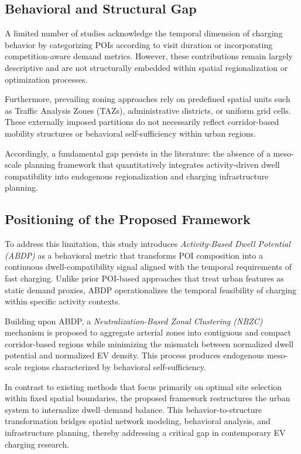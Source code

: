 \documentclass[conference]{IEEEtran}
\begin{document}
\subsection{Behavioral and Structural Gap}

A limited number of studies acknowledge the temporal dimension of charging behavior by categorizing POIs according to visit duration or incorporating competition-aware demand metrics. However, these contributions remain largely descriptive and are not structurally embedded within spatial regionalization or optimization processes.

Furthermore, prevailing zoning approaches rely on predefined spatial units such as Traffic Analysis Zones (TAZs), administrative districts, or uniform grid cells. These externally imposed partitions do not necessarily reflect corridor-based mobility structures or behavioral self-sufficiency within urban regions.

Accordingly, a fundamental gap persists in the literature: the absence of a meso-scale planning framework that quantitatively integrates activity-driven dwell compatibility into endogenous regionalization and charging infrastructure planning.

\subsection{Positioning of the Proposed Framework}

To address this limitation, this study introduces \emph{Activity-Based Dwell Potential (ABDP)} as a behavioral metric that transforms POI composition into a continuous dwell-compatibility signal aligned with the temporal requirements of fast charging. Unlike prior POI-based approaches that treat urban features as static demand proxies, ABDP operationalizes the temporal feasibility of charging within specific activity contexts.

Building upon ABDP, a \emph{Neutralization-Based Zonal Clustering (NBZC)} mechanism is proposed to aggregate arterial zones into contiguous and compact corridor-based regions while minimizing the mismatch between normalized dwell potential and normalized EV density. This process produces endogenous meso-scale regions characterized by behavioral self-sufficiency.

In contrast to existing methods that focus primarily on optimal site selection within fixed spatial boundaries, the proposed framework restructures the urban system to internalize dwell--demand balance. This behavior-to-structure transformation bridges spatial network modeling, behavioral analysis, and infrastructure planning, thereby addressing a critical gap in contemporary EV charging research.
\end{document}
